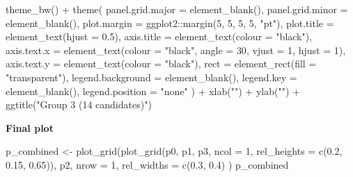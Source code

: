 \documentclass[
  11pt,
  oneside]{book}
\newenvironment{Shaded}{\begin{snugshade}}{\end{snugshade}}
\newcommand{\AttributeTok}[1]{\textcolor[rgb]{0.77,0.63,0.00}{#1}}
\newcommand{\DecValTok}[1]{\textcolor[rgb]{0.00,0.00,0.81}{#1}}
\newcommand{\FloatTok}[1]{\textcolor[rgb]{0.00,0.00,0.81}{#1}}
\newcommand{\FunctionTok}[1]{\textcolor[rgb]{0.00,0.00,0.00}{#1}}
\newcommand{\NormalTok}[1]{#1}
\newcommand{\OtherTok}[1]{\textcolor[rgb]{0.56,0.35,0.01}{#1}}
\newcommand{\SpecialCharTok}[1]{\textcolor[rgb]{0.00,0.00,0.00}{#1}}
\newcommand{\StringTok}[1]{\textcolor[rgb]{0.31,0.60,0.02}{#1}}
\begin{document}
\begin{Shaded}
\begin{Highlighting}[]
  \FunctionTok{theme\_bw}\NormalTok{() }\SpecialCharTok{+}
  \FunctionTok{theme}\NormalTok{(}
    \AttributeTok{panel.grid.major =} \FunctionTok{element\_blank}\NormalTok{(),}
    \AttributeTok{panel.grid.minor =} \FunctionTok{element\_blank}\NormalTok{(),}
    \AttributeTok{plot.margin =}\NormalTok{ ggplot2}\SpecialCharTok{::}\FunctionTok{margin}\NormalTok{(}\DecValTok{5}\NormalTok{, }\DecValTok{5}\NormalTok{, }\DecValTok{5}\NormalTok{, }\DecValTok{5}\NormalTok{, }\StringTok{"pt"}\NormalTok{),}
    \AttributeTok{plot.title =} \FunctionTok{element\_text}\NormalTok{(}\AttributeTok{hjust =} \FloatTok{0.5}\NormalTok{),}
    \AttributeTok{axis.title =} \FunctionTok{element\_text}\NormalTok{(}\AttributeTok{colour =} \StringTok{"black"}\NormalTok{),}
    \AttributeTok{axis.text.x =} \FunctionTok{element\_text}\NormalTok{(}\AttributeTok{colour =} \StringTok{"black"}\NormalTok{, }\AttributeTok{angle =} \DecValTok{30}\NormalTok{, }\AttributeTok{vjust =} \DecValTok{1}\NormalTok{, }\AttributeTok{hjust =} \DecValTok{1}\NormalTok{),}
    \AttributeTok{axis.text.y =} \FunctionTok{element\_text}\NormalTok{(}\AttributeTok{colour =} \StringTok{"black"}\NormalTok{),}
    \AttributeTok{rect =} \FunctionTok{element\_rect}\NormalTok{(}\AttributeTok{fill =} \StringTok{"transparent"}\NormalTok{),}
    \AttributeTok{legend.background =} \FunctionTok{element\_blank}\NormalTok{(),}
    \AttributeTok{legend.key =} \FunctionTok{element\_blank}\NormalTok{(),}
    \AttributeTok{legend.position =} \StringTok{"none"}
\NormalTok{  ) }\SpecialCharTok{+}
  \FunctionTok{xlab}\NormalTok{(}\StringTok{""}\NormalTok{) }\SpecialCharTok{+}
  \FunctionTok{ylab}\NormalTok{(}\StringTok{""}\NormalTok{) }\SpecialCharTok{+}
  \FunctionTok{ggtitle}\NormalTok{(}\StringTok{"Group 3 (14 candidates)"}\NormalTok{)}
\end{Highlighting}
\end{Shaded}

\textbf{Final plot}

\begin{Shaded}
\begin{Highlighting}[]
\NormalTok{p\_combined }\OtherTok{\textless{}{-}} \FunctionTok{plot\_grid}\NormalTok{(}\FunctionTok{plot\_grid}\NormalTok{(p0, p1, p3, }\AttributeTok{ncol =} \DecValTok{1}\NormalTok{, }\AttributeTok{rel\_heights =} \FunctionTok{c}\NormalTok{(}\FloatTok{0.2}\NormalTok{, }\FloatTok{0.15}\NormalTok{, }\FloatTok{0.65}\NormalTok{)),}
\NormalTok{  p2,}
  \AttributeTok{nrow =} \DecValTok{1}\NormalTok{, }\AttributeTok{rel\_widths =} \FunctionTok{c}\NormalTok{(}\FloatTok{0.3}\NormalTok{, }\FloatTok{0.4}\NormalTok{)}
\NormalTok{)}
\NormalTok{p\_combined}
\end{Highlighting}
\end{Shaded}
\end{document}
